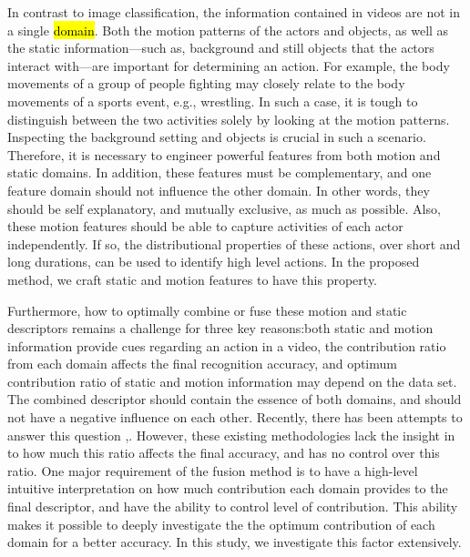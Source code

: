 In contrast to image classification, the information contained in videos
are not in a single \hl{domain}. Both the motion patterns of the actors and objects, as well as the static
 information---such as, background and still objects that the actors interact with---are important for determining an action.
For example, the body movements of a group of people fighting may closely relate to
the body movements of a sports event, e.g., wrestling. In such a case, it is tough to distinguish between the two
activities solely by looking at the motion patterns. Inspecting the background setting
and objects is crucial in such a scenario. Therefore, it is necessary to engineer powerful features
from both motion and static domains. In addition, these features must be complementary, and one feature domain should
not influence the other domain. In other words, they should be self explanatory, and mutually exclusive, as much as possible.
Also, these motion features should be able to capture
activities of each actor independently. If so, the distributional properties of these actions, over short
and long durations, can be used to identify high level actions. In the proposed method, we craft static and motion features to have this property.

Furthermore, how to optimally combine or fuse these motion and static descriptors remains a challenge for three key reasons:both static and motion information
provide cues regarding an action in a video, the contribution ratio from each domain affects the final recognition accuracy,
and optimum contribution ratio of static and motion information may depend on the data set.
The combined descriptor should contain the essence of both domains, and should not have a
negative influence on each other. Recently, there has been attempts to answer this question \cite{7486474},\cite{simonyan2014two}. However,
these existing methodologies lack the insight in to how much this ratio affects the final accuracy, and has no control over this ratio.
One major requirement of the fusion method is to have a high-level intuitive interpretation on how much contribution each domain provides to the
final descriptor, and have the ability to control level of contribution. This ability makes it possible
to deeply investigate the the optimum contribution of each domain for a better accuracy. In this study, we investigate this factor
extensively.

